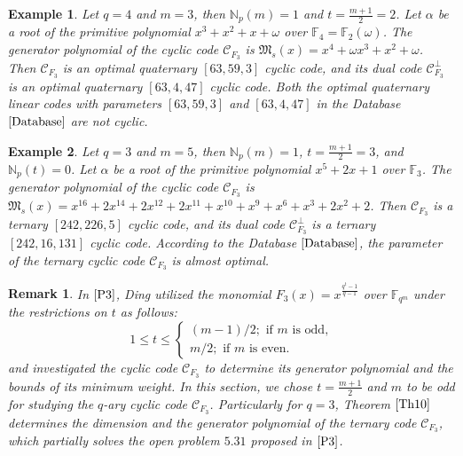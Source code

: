 \documentclass[pdflatex,sn-mathphys-num]{sn-jnl}%
\theoremstyle{thmstyleone}%
\theoremstyle{thmstyletwo}%
\newtheorem{example}{Example}%
\newtheorem{remark}{Remark}%
\theoremstyle{thmstylethree}%
\begin{document}
\vspace{1em}
\begin{example}
    Let $q=4$ and $m=3$, then $\mathbb{N}_{p}(m)=1$ and $t=\frac{m+1}{2}=2$. Let $\alpha$ be a root of the primitive polynomial $x^3 + x^2 + x + \omega$ over $\mathbb{F}_{4}=\mathbb{F}_{2}(\omega)$. The generator polynomial of the cyclic code $\mathcal{C}_{F_{3}}$ is $\mathfrak{M}_{s}(x)=x^4 + \omega x^3 + x^2 + \omega$. Then $\mathcal{C}_{F_{3}}$ is an optimal quaternary $[63, 59, 3]$ cyclic code, and its dual code $\mathcal{C}_{F_{3}}^{\perp}$ is an optimal quaternary $[63,4,47]$ cyclic code. Both the optimal quaternary linear codes with parameters $[63, 59, 3]$ and $[63,4,47]$ in the Database $\textnormal{\cite{Database}}$ are not cyclic.
\end{example}
\vspace{1em}
\begin{example}
    Let $q=3$ and $m=5$, then $\mathbb{N}_{p}(m)=1$, $t=\frac{m+1}{2}=3$, and $\mathbb{N}_{p}(t)=0$. Let $\alpha$ be a root of the primitive polynomial $x^5 + 2x + 1$ over $\mathbb{F}_{3}$. The generator polynomial of the cyclic code $\mathcal{C}_{F_{3}}$ is $\mathfrak{M}_{s}(x)=x^{16} + 2x^{14} +
    2x^{12} + 2x^{11} + x^{10} + x^9 + x^6 + x^3 + 2x^2 + 2$. Then $\mathcal{C}_{F_{3}}$ is a ternary $[242, 226, 5]$ cyclic code, and its dual code $\mathcal{C}_{F_{3}}^{\perp}$ is a ternary $[242, 16, 131]$ cyclic code. According to the Database $\textnormal{\cite{Database}}$, the parameter of the ternary cyclic code $\mathcal{C}_{F_{3}}$ is almost optimal.  %
\end{example}
\vspace{1em}
\begin{remark}\label{Remark1}
 In $\textnormal{\cite[Section $5.3$]{P3}}$, Ding utilized the monomial $F_{3}(x)=x^{\frac{q^{t}-1}{q-1}}$ over $\mathbb{F}_{q^m}$ under the restrictions on $t$ as follows:
 \begin{equation*}
     1\leq t\leq \begin{cases}
     (m-1)/2;\text{ if $m$ is odd,} \\
     m/2;\text{ if $m$ is even.}
     \end{cases}
 \end{equation*}
 and investigated the cyclic code $\mathcal{C}_{F_{3}}$ to determine its generator polynomial and the bounds of its minimum weight. In this section, we chose $t=\frac{m+1}{2}$ and $m$ to be odd for studying the $q$-ary cyclic code $\mathcal{C}_{F_{3}}$. Particularly for $q=3$, Theorem $\ref{Th10}$ determines the dimension and the generator polynomial of the ternary code $\mathcal{C}_{F_{3}}$, which partially solves the open problem $5.31$ proposed in $\textnormal{\cite{P3}}$.
\end{remark}
\end{document}
